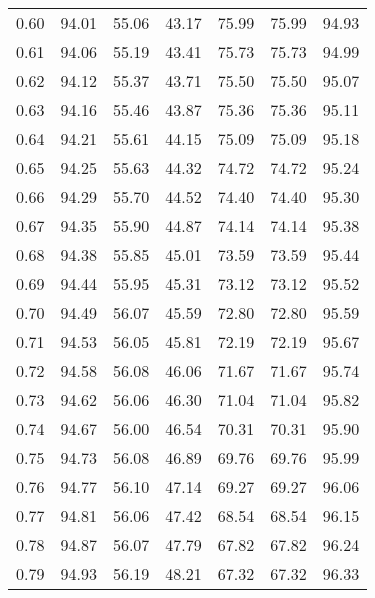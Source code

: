 \begin{tabular}{|c|c|c|c|c|c|c|}
      0.60 &     94.01 &     55.06 &      43.17 &   75.99 &      75.99 &         94.93 \\
      0.61 &     94.06 &     55.19 &      43.41 &   75.73 &      75.73 &         94.99 \\
      0.62 &     94.12 &     55.37 &      43.71 &   75.50 &      75.50 &         95.07 \\
      0.63 &     94.16 &     55.46 &      43.87 &   75.36 &      75.36 &         95.11 \\
      0.64 &     94.21 &     55.61 &      44.15 &   75.09 &      75.09 &         95.18 \\
      0.65 &     94.25 &     55.63 &      44.32 &   74.72 &      74.72 &         95.24 \\
      0.66 &     94.29 &     55.70 &      44.52 &   74.40 &      74.40 &         95.30 \\
      0.67 &     94.35 &     55.90 &      44.87 &   74.14 &      74.14 &         95.38 \\
      0.68 &     94.38 &     55.85 &      45.01 &   73.59 &      73.59 &         95.44 \\
      0.69 &     94.44 &     55.95 &      45.31 &   73.12 &      73.12 &         95.52 \\
      0.70 &     94.49 &     56.07 &      45.59 &   72.80 &      72.80 &         95.59 \\
      0.71 &     94.53 &     56.05 &      45.81 &   72.19 &      72.19 &         95.67 \\
      0.72 &     94.58 &     56.08 &      46.06 &   71.67 &      71.67 &         95.74 \\
      0.73 &     94.62 &     56.06 &      46.30 &   71.04 &      71.04 &         95.82 \\
      0.74 &     94.67 &     56.00 &      46.54 &   70.31 &      70.31 &         95.90 \\
      0.75 &     94.73 &     56.08 &      46.89 &   69.76 &      69.76 &         95.99 \\
      0.76 &     94.77 &     56.10 &      47.14 &   69.27 &      69.27 &         96.06 \\
      0.77 &     94.81 &     56.06 &      47.42 &   68.54 &      68.54 &         96.15 \\
      0.78 &     94.87 &     56.07 &      47.79 &   67.82 &      67.82 &         96.24 \\
      0.79 &     94.93 &     56.19 &      48.21 &   67.32 &      67.32 &         96.33 \\

\end{tabular}
